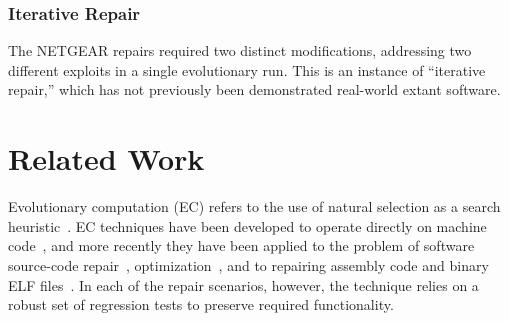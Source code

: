 \documentclass{sigcomm-alternate}
\begin{document}
\subsubsection{Iterative Repair}
\label{iterative-repair}
The NETGEAR  repairs required two distinct modifications, addressing two different
exploits in a single evolutionary run.  This is an instance of
``iterative repair,'' which has not previously been demonstrated 
real-world extant software.
%


\section{Related Work}

Evolutionary computation (EC) refers to the use of natural selection
as a search heuristic~\cite{holland1992adaptation,koza1992genetic}.
EC techniques have been developed to operate 
directly on machine code~\cite{kuhling2002brute}, and more recently
they have been applied to the problem of software source-code
repair~\cite{weimer2009automatically,genprog-tse-journa},
optimization~\cite{sitthi2011genetic,schulte2013optimization}, and to
repairing assembly code and binary ELF
files~\cite{schulte2013embedded}.  In each of the repair scenarios,
however, the technique relies on a robust set of regression tests to
preserve required functionality.
\end{document}

